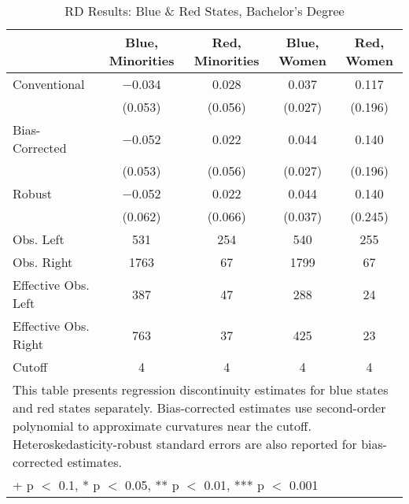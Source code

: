 \begin{table}

\caption{RD Results: Blue \& Red States, Bachelor's Degree}
\centering
\begin{tabular}[t]{lcccc}
\toprule
  & Blue, Minorities & Red, Minorities & Blue, Women & Red, Women\\
\midrule
Conventional & \num{-0.034} & \num{0.028} & \num{0.037} & \num{0.117}\\
 & (\num{0.053}) & (\num{0.056}) & (\num{0.027}) & \vphantom{1} (\num{0.196})\\
Bias-Corrected & \num{-0.052} & \num{0.022} & \num{0.044} & \num{0.140}\\
 & (\num{0.053}) & (\num{0.056}) & (\num{0.027}) & (\num{0.196})\\
Robust & \num{-0.052} & \num{0.022} & \num{0.044} & \num{0.140}\\
 & (\num{0.062}) & (\num{0.066}) & (\num{0.037}) & (\num{0.245})\\
\midrule
Obs. Left & \num{531} & \num{254} & \num{540} & \num{255}\\
Obs. Right & \num{1763} & \num{67} & \num{1799} & \num{67}\\
Effective Obs. Left & \num{387} & \num{47} & \num{288} & \num{24}\\
Effective Obs. Right & \num{763} & \num{37} & \num{425} & \num{23}\\
Cutoff & \num{4} & \num{4} & \num{4} & \num{4}\\
\bottomrule
\multicolumn{5}{l}{\rule{0pt}{1em}This table presents regression discontinuity estimates
                for blue states and red states separately.
                Bias-corrected estimates use second-order polynomial
                to approximate curvatures near the cutoff. Heteroskedasticity-robust
                standard errors are also reported for bias-corrected estimates.}\\
\multicolumn{5}{l}{\rule{0pt}{1em}+ p $<$ 0.1, * p $<$ 0.05, ** p $<$ 0.01, *** p $<$ 0.001}\\
\end{tabular}
\end{table}
